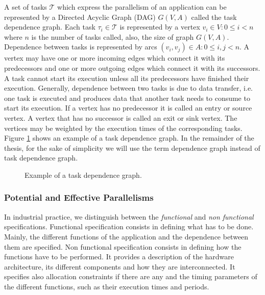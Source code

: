 A set of tasks $\mathcal{T}$ which express the parallelism of an application can be represented by a Directed Acyclic Graph (DAG) $G(V,A)$ called the task dependence graph. Each task $\tau_i \in \mathcal{T}$ is represented by a vertex $v_i \in V: 0 \leq i < n$ where $n$ is the number of tasks called, also, the size of graph $G(V,A)$. Dependence between tasks is represented by arcs $(v_i, v_j) \in A: 0 \leq i,j < n$. A vertex may have one or more incoming edges which connect it with its predecessors and one or more outgoing edges which connect it with its successors. A task cannot start its execution unless all its predecessors have finished their execution. Generally, dependence between two tasks is due to data transfer, i.e. one task is executed and produces data that another task needs to consume to start its execution. If a vertex has no predecessor it is called an entry or source vertex. A vertex that has no successor is called an exit or sink vertex. The vertices may be weighted by the execution times of the corresponding tasks. Figure \ref{fig:dagex} shows an example of a task dependence graph. In the remainder of the thesis, for the sake of simplicity we will use the term dependence graph instead of task dependence graph.

\begin{figure}[phbt]
\centering

\caption{Example of a task dependence graph.}
\label{fig:dagex}
\end{figure} 

\subsubsection{Potential and Effective Parallelisms}

In industrial practice, we distinguish between the \textit{functional} and \textit{non functional} specifications. Functional specification consists in defining what has to be done. Mainly, the different functions of the application and the dependence between them are specified. Non functional specification consists in defining how the functions have to be performed. It provides a description of the hardware architecture, its different components and how they are interconnected. It specifies also allocation constraints if there are any and the timing parameters of the different functions, such as their execution times and periods.

